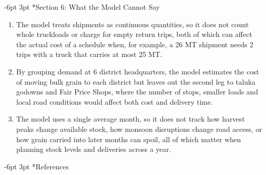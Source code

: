 \documentclass[10pt,a4paper]{article}
\makeatletter
\renewcommand\section{\@startsection {section}{1}{\z@}%
                                   {-6pt \@plus -2pt \@minus -2pt}%
                                   {3pt \@plus 1pt}%
                                   {\normalfont\Large\bfseries}}
\makeatother
\begin{document}
\newpage

\section*{Section 6: What the Model Cannot Say}

\begin{enumerate}\setlength{\itemsep}{16pt}\large
\item The model treats shipments as continuous quantities, so it does not count whole truckloads or charge for empty return trips, both of which can affect the actual cost of a schedule when, for example, a 26 MT shipment needs 2 trips with a truck that carries at most 25 MT.

\item By grouping demand at 6 district headquarters, the model estimates the cost of moving bulk grain to each district but leaves out the second leg to taluka godowns and Fair Price Shops, where the number of stops, smaller loads and local road conditions would affect both cost and delivery time.

\item The model uses a single average month, so it does not track how harvest peaks change available stock, how monsoon disruptions change road access, or how grain carried into later months can spoil, all of which matter when planning stock levels and deliveries across a year.
\end{enumerate}

\newpage

\section*{References}
\end{document}
